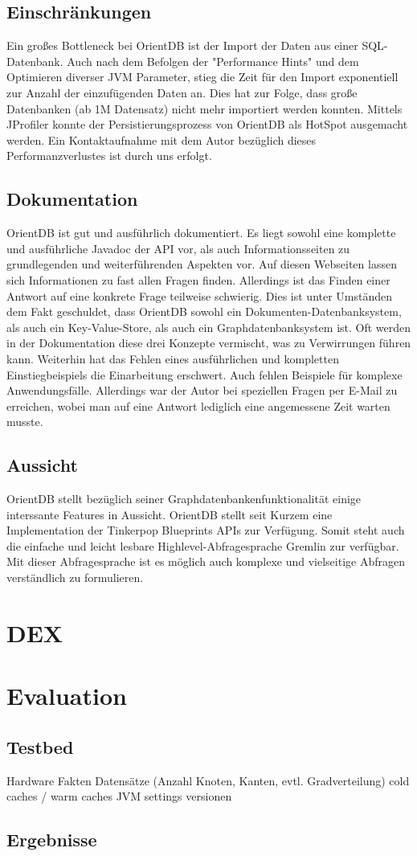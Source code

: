 \documentclass[11pt, a4paper, oneside, twocolumn]{article} %
\begin{document}
\subsection{Einschränkungen}
Ein großes Bottleneck bei OrientDB ist der Import der Daten aus einer SQL-Datenbank. Auch nach dem Befolgen der "Performance Hints" und dem Optimieren diverser JVM Parameter, stieg die Zeit für den Import exponentiell zur Anzahl der einzufügenden Daten an. Dies hat zur Folge, dass große Datenbanken (ab 1M Datensatz) nicht mehr importiert werden konnten. Mittels JProfiler konnte der Persistierungsprozess von OrientDB als HotSpot ausgemacht werden. Ein Kontaktaufnahme mit dem Autor bezüglich dieses Performanzverlustes ist durch uns erfolgt.

\subsection{Dokumentation}
OrientDB ist gut und ausführlich dokumentiert. Es liegt sowohl eine komplette und ausführliche Javadoc der API vor, als auch Informationsseiten zu grundlegenden und weiterführenden Aspekten vor. Auf diesen Webseiten lassen sich Informationen zu fast allen Fragen finden. Allerdings ist das Finden einer Antwort auf eine konkrete Frage teilweise schwierig. Dies ist unter Umständen dem Fakt geschuldet, dass OrientDB sowohl ein Dokumenten-Datenbanksystem, als auch ein Key-Value-Store, als auch ein Graphdatenbanksystem ist. Oft werden in der Dokumentation diese drei Konzepte vermischt, was zu Verwirrungen führen kann. Weiterhin hat das Fehlen eines ausführlichen und kompletten Einstiegbeispiels die Einarbeitung erschwert. Auch fehlen Beispiele für komplexe Anwendungsfälle. Allerdings war der Autor bei speziellen Fragen per E-Mail zu erreichen, wobei man auf eine Antwort lediglich eine angemessene Zeit warten musste.

\subsection{Aussicht}
OrientDB stellt bezüglich seiner Graphdatenbankenfunktionalität einige interssante Features in Aussicht. OrientDB stellt seit Kurzem eine Implementation der Tinkerpop Blueprints APIs zur Verfügung. Somit steht auch die einfache und leicht lesbare Highlevel-Abfragesprache Gremlin zur verfügbar. Mit dieser Abfragesprache ist es möglich auch komplexe und vielseitige Abfragen verständlich zu formulieren.


\section{DEX}

\section{Evaluation}

\subsection{Testbed}

Hardware Fakten
Datensätze (Anzahl Knoten, Kanten, evtl. Gradverteilung)
cold caches / warm caches
JVM settings
versionen

\subsection{Ergebnisse}
\end{document}
